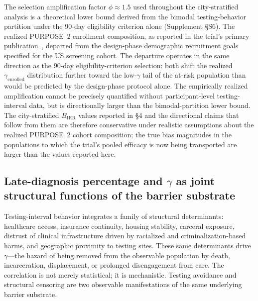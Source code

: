\documentclass[11pt]{article}
\begin{document}
The selection amplification factor $\phi \approx 1.5$ used throughout the city-stratified analysis is a theoretical lower bound derived from the bimodal testing-behavior partition under the 90-day eligibility criterion alone (Supplement \S S6). The realized PURPOSE~2 enrollment composition, as reported in the trial's primary publication~\cite{kelley2025}, departed from the design-phase demographic recruitment goals specified for the US screening cohort. The departure operates in the same direction as the 90-day eligibility-criterion selection: both shift the realized $\gamma_{\mathrm{enrolled}}$ distribution further toward the low-$\gamma$ tail of the at-risk population than would be predicted by the design-phase protocol alone. The empirically realized amplification cannot be precisely quantified without participant-level testing-interval data, but is directionally larger than the bimodal-partition lower bound. The city-stratified $B_{\mathrm{IRR}}$ values reported in \S4 and the directional claims that follow from them are therefore conservative under realistic assumptions about the realized PURPOSE~2 cohort composition; the true bias magnitudes in the populations to which the trial's pooled efficacy is now being transported are larger than the values reported here.
\subsection{Late-diagnosis percentage and \texorpdfstring{$\gamma$}{gamma} as joint structural functions of the barrier substrate}

Testing-interval behavior integrates a family of structural determinants: healthcare access, insurance continuity, housing stability, carceral exposure, distrust of clinical infrastructure driven by racialized and criminalization-based harms, and geographic proximity to testing sites. These same determinants drive $\gamma$---the hazard of being removed from the observable population by death, incarceration, displacement, or prolonged disengagement from care. The correlation is not merely statistical; it is mechanistic. Testing avoidance and structural censoring are two observable manifestations of the same underlying barrier substrate.
\end{document}
